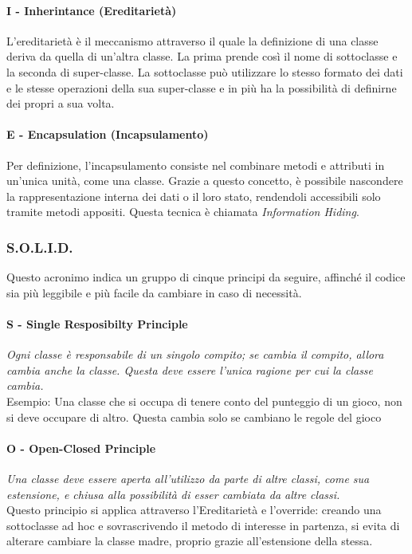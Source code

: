 \documentclass{article}
\begin{document}
            \paragraph{I - Inherintance (Ereditarietà)} L'ereditarietà è il meccanismo attraverso il quale la definizione di una classe deriva da quella di un'altra classe. La prima prende così il nome di sottoclasse e la seconda di super-classe. La sottoclasse può utilizzare lo stesso formato dei dati e le stesse operazioni della sua super-classe e in più ha la possibilità di definirne dei propri a sua volta.
            
            \paragraph{E - Encapsulation (Incapsulamento)} Per definizione, l'incapsulamento consiste nel combinare metodi e attributi in un'unica unità, come una classe. Grazie a questo concetto, è possibile nascondere la rappresentazione interna dei dati o il loro stato, rendendoli accessibili solo tramite metodi appositi. Questa tecnica è chiamata \textit{Information Hiding}.
            
        \subsubsection{S.O.L.I.D.}
            Questo acronimo indica un gruppo di cinque principi da seguire, affinché il codice sia più leggibile e più facile da cambiare in caso di necessità.
            \paragraph{S - Single Resposibilty Principle} \textit{Ogni classe è responsabile di un singolo compito; se cambia il compito, allora cambia anche la classe. Questa deve essere l'unica ragione per cui la classe cambia.}\\
            Esempio: Una classe che si occupa di tenere conto del punteggio di un gioco, non si deve occupare di altro. Questa cambia solo se cambiano le regole del gioco
            \paragraph{O - Open-Closed Principle} \textit{Una classe deve essere aperta all'utilizzo da parte di altre classi, come sua estensione, e chiusa alla possibilità di esser cambiata da altre classi.}\\
            Questo principio si applica attraverso l'Ereditarietà e l'override: creando una sottoclasse ad hoc e sovrascrivendo il metodo di interesse in partenza, si evita di alterare cambiare la classe madre, proprio grazie all'estensione della stessa.
\end{document}
